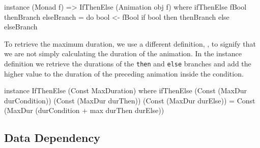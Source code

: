 \begin{code}
instance (Monad f) => IfThenElse (Animation obj f) where
  ifThenElse fBool thenBranch elseBranch = do
    bool <- fBool
    if bool then thenBranch else elseBranch
\end{code}

To retrieve the maximum duration, we use a different  definition, , to signify that we are not simply calculating the duration of the animation. In the instance definition we retrieve the durations of the \texttt{then} and \texttt{else} branches and add the higher value to the duration of the preceding animation inside the condition.

\begin{code}
 instance IfThenElse (Const MaxDuration) where
   ifThenElse (Const (MaxDur durCondition))
              (Const (MaxDur durThen))
              (Const (MaxDur durElse)) =
   Const (MaxDur (durCondition + max durThen durElse))
\end{code}

\subsection{Data Dependency}


